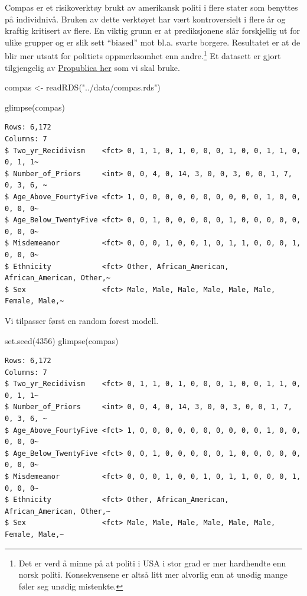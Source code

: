 \documentclass[
  letterpaper,
  DIV=11,
  numbers=noendperiod]{scrreprt}
\newenvironment{Shaded}{\begin{snugshade}}{\end{snugshade}}
\newcommand{\DecValTok}[1]{\textcolor[rgb]{0.68,0.00,0.00}{#1}}
\newcommand{\FunctionTok}[1]{\textcolor[rgb]{0.28,0.35,0.67}{#1}}
\newcommand{\NormalTok}[1]{\textcolor[rgb]{0.00,0.23,0.31}{#1}}
\newcommand{\OtherTok}[1]{\textcolor[rgb]{0.00,0.23,0.31}{#1}}
\newcommand{\StringTok}[1]{\textcolor[rgb]{0.13,0.47,0.30}{#1}}
\begin{document}
Compas er et risikoverktøy brukt av amerikansk politi i flere stater som
benyttes på individnivå. Bruken av dette verktøyet har vært
kontroversielt i flere år og kraftig kritisert av flere. En viktig grunn
er at prediksjonene slår forskjellig ut for ulike grupper og er slik
sett ``biased'' mot bl.a. svarte borgere. Resultatet er at de blir mer
utsatt for politiets oppmerksomhet enn andre.\footnote{Det er verd å
  minne på at politi i USA i stor grad er mer hardhendte enn norsk
  politi. Konsekvensene er altså litt mer alvorlig enn at unødig mange
  føler seg unødig mistenkte.} Et datasett er gjort tilgjengelig av
\href{https://www.propublica.org/datastore/dataset/compas-recidivism-risk-score-data-and-analysis}{Propublica
her} som vi skal bruke.

\begin{Shaded}
\begin{Highlighting}[]
\NormalTok{compas }\OtherTok{\textless{}{-}} \FunctionTok{readRDS}\NormalTok{(}\StringTok{"../data/compas.rds"}\NormalTok{)}

\FunctionTok{glimpse}\NormalTok{(compas)}
\end{Highlighting}
\end{Shaded}

\begin{verbatim}
Rows: 6,172
Columns: 7
$ Two_yr_Recidivism    <fct> 0, 1, 1, 0, 1, 0, 0, 0, 1, 0, 0, 1, 1, 0, 0, 1, 1~
$ Number_of_Priors     <int> 0, 0, 4, 0, 14, 3, 0, 0, 3, 0, 0, 1, 7, 0, 3, 6, ~
$ Age_Above_FourtyFive <fct> 1, 0, 0, 0, 0, 0, 0, 0, 0, 0, 0, 1, 0, 0, 0, 0, 0~
$ Age_Below_TwentyFive <fct> 0, 0, 1, 0, 0, 0, 0, 0, 1, 0, 0, 0, 0, 0, 0, 0, 0~
$ Misdemeanor          <fct> 0, 0, 0, 1, 0, 0, 1, 0, 1, 1, 0, 0, 0, 1, 0, 0, 0~
$ Ethnicity            <fct> Other, African_American, African_American, Other,~
$ Sex                  <fct> Male, Male, Male, Male, Male, Male, Female, Male,~
\end{verbatim}

Vi tilpasser først en random forest modell.

\begin{Shaded}
\begin{Highlighting}[]
\FunctionTok{set.seed}\NormalTok{(}\DecValTok{4356}\NormalTok{)}
\FunctionTok{glimpse}\NormalTok{(compas)}
\end{Highlighting}
\end{Shaded}

\begin{verbatim}
Rows: 6,172
Columns: 7
$ Two_yr_Recidivism    <fct> 0, 1, 1, 0, 1, 0, 0, 0, 1, 0, 0, 1, 1, 0, 0, 1, 1~
$ Number_of_Priors     <int> 0, 0, 4, 0, 14, 3, 0, 0, 3, 0, 0, 1, 7, 0, 3, 6, ~
$ Age_Above_FourtyFive <fct> 1, 0, 0, 0, 0, 0, 0, 0, 0, 0, 0, 1, 0, 0, 0, 0, 0~
$ Age_Below_TwentyFive <fct> 0, 0, 1, 0, 0, 0, 0, 0, 1, 0, 0, 0, 0, 0, 0, 0, 0~
$ Misdemeanor          <fct> 0, 0, 0, 1, 0, 0, 1, 0, 1, 1, 0, 0, 0, 1, 0, 0, 0~
$ Ethnicity            <fct> Other, African_American, African_American, Other,~
$ Sex                  <fct> Male, Male, Male, Male, Male, Male, Female, Male,~
\end{verbatim}
\end{document}
